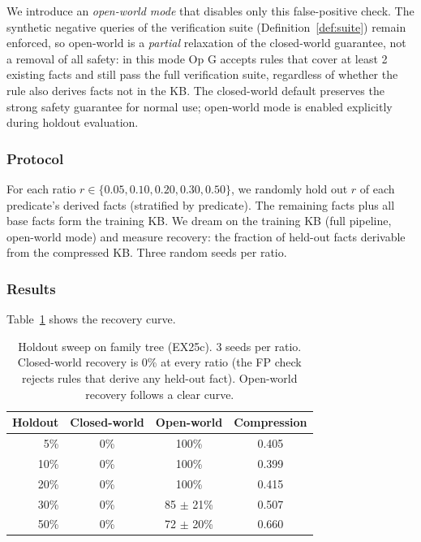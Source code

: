 \documentclass[10pt,conference]{IEEEtran}
\begin{document}
We introduce an \emph{open-world mode} that disables only this false-positive check. The synthetic negative queries of the verification suite (Definition~\ref{def:suite}) remain enforced, so open-world is a \emph{partial} relaxation of the closed-world guarantee, not a removal of all safety: in this mode Op G accepts rules that cover at least 2 existing facts and still pass the full verification suite, regardless of whether the rule also derives facts not in the KB. The closed-world default preserves the strong safety guarantee for normal use; open-world mode is enabled explicitly during holdout evaluation.

\subsubsection{Protocol}
For each ratio $r \in \{0.05, 0.10, 0.20, 0.30, 0.50\}$, we randomly hold out $r$ of each predicate's derived facts (stratified by predicate). The remaining facts plus all base facts form the training KB. We dream on the training KB (full pipeline, open-world mode) and measure recovery: the fraction of held-out facts derivable from the compressed KB. Three random seeds per ratio.

\subsubsection{Results}

Table~\ref{tab:holdout_sweep} shows the recovery curve.

\begin{table}[t]
\centering
\caption{Holdout sweep on family tree (EX25c). 3 seeds per ratio. Closed-world recovery is 0\% at every ratio (the FP check rejects rules that derive any held-out fact). Open-world recovery follows a clear curve.}
\label{tab:holdout_sweep}
\begin{tabular}{rccc}
\toprule
\textbf{Holdout} & \textbf{Closed-world} & \textbf{Open-world} & \textbf{Compression} \\
\midrule
5\%  & 0\% & 100\%       & 0.405 \\
10\% & 0\% & 100\%       & 0.399 \\
20\% & 0\% & 100\%       & 0.415 \\
30\% & 0\% & 85 $\pm$ 21\% & 0.507 \\
50\% & 0\% & 72 $\pm$ 20\% & 0.660 \\
\bottomrule
\end{tabular}
\end{table}
\end{document}
